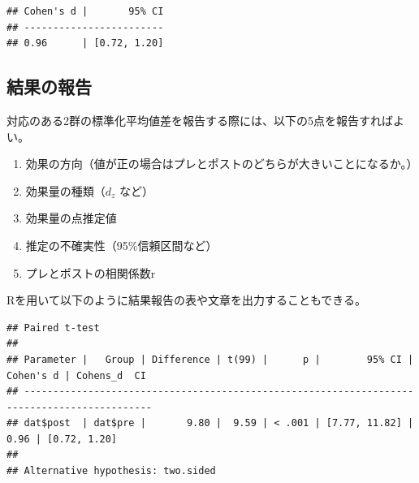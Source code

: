 \documentclass[
  ja=standard, xelatex, base=12pt]{bxjsreport}
\newenvironment{Shaded}{\begin{snugshade}}{\end{snugshade}}
\newcommand{\AttributeTok}[1]{\textcolor[rgb]{0.77,0.63,0.00}{#1}}
\newcommand{\CommentTok}[1]{\textcolor[rgb]{0.56,0.35,0.01}{\textit{#1}}}
\newcommand{\FunctionTok}[1]{\textcolor[rgb]{0.00,0.00,0.00}{#1}}
\newcommand{\NormalTok}[1]{#1}
\newcommand{\SpecialCharTok}[1]{\textcolor[rgb]{0.00,0.00,0.00}{#1}}
\providecommand{\tightlist}{%
  \setlength{\itemsep}{0pt}\setlength{\parskip}{0pt}}
\begin{document}
\begin{verbatim}
## Cohen's d |       95% CI
## ------------------------
## 0.96      | [0.72, 1.20]
\end{verbatim}

\hypertarget{ux7d50ux679cux306eux5831ux544a-2}{%
\subsection{結果の報告}\label{ux7d50ux679cux306eux5831ux544a-2}}

対応のある2群の標準化平均値差を報告する際には、以下の5点を報告すればよい。

\begin{enumerate}
\def\labelenumi{\arabic{enumi}.}
\tightlist
\item
  効果の方向（値が正の場合はプレとポストのどちらが大きいことになるか。）
\item
  効果量の種類（\(d_z\) など）
\item
  効果量の点推定値
\item
  推定の不確実性（95\%信頼区間など）
\item
  プレとポストの相関係数r
\end{enumerate}

Rを用いて以下のように結果報告の表や文章を出力することもできる。

\begin{Shaded}
\end{Shaded}

\begin{verbatim}
## Paired t-test
## 
## Parameter |   Group | Difference | t(99) |      p |        95% CI | Cohen's d | Cohens_d  CI
## --------------------------------------------------------------------------------------------
## dat$post  | dat$pre |       9.80 |  9.59 | < .001 | [7.77, 11.82] |      0.96 | [0.72, 1.20]
## 
## Alternative hypothesis: two.sided
\end{verbatim}

\begin{Shaded}
\end{Shaded}
\end{document}
